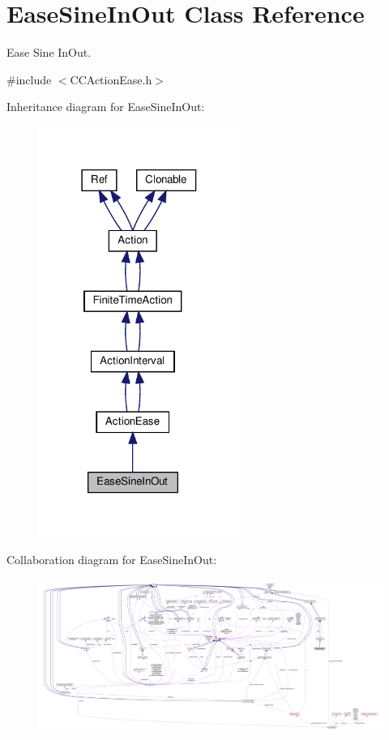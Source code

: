\hypertarget{classEaseSineInOut}{}\section{Ease\+Sine\+In\+Out Class Reference}
\label{classEaseSineInOut}


Ease Sine In\+Out.  




{\ttfamily \#include $<$C\+C\+Action\+Ease.\+h$>$}



Inheritance diagram for Ease\+Sine\+In\+Out\+:
\nopagebreak
\begin{figure}[H]
\begin{center}
\leavevmode
\includegraphics[width=186pt]{classEaseSineInOut__inherit__graph}
\end{center}
\end{figure}


Collaboration diagram for Ease\+Sine\+In\+Out\+:
\nopagebreak
\begin{figure}[H]
\begin{center}
\leavevmode
\includegraphics[width=350pt]{classEaseSineInOut__coll__graph}
\end{center}
\end{figure}
